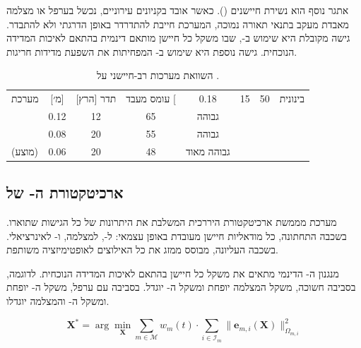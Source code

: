 אתגר נוסף הוא נשירת חיישנים (). כאשר 
אובד בקניונים עירוניים,  נכשל בערפל או מצלמה מאבדת
מעקב בתנאי תאורה נמוכה, המערכת חייבת להתדרדר באופן הדרגתי
ולא להתבדר. גישה מקובלת היא שימוש ב-,
שבו משקל כל חיישן מותאם דינמית בהתאם לאיכות המדידה הנוכחית.
גישה נוספת היא שימוש ב- המפחיתות
את השפעת מדידות חריגות.

\begin{table}[H]
\centering
\begin{tabular}{lcccc}
\toprule
מערכת &  [מ׳] & תדר [הרץ] & עומס מעבד [%
\midrule
{} & 0.18 & 15 & 50 & בינונית \\
 & 0.12 & 12 & 65 & גבוהה \\
 & 0.08 & 20 & 55 & גבוהה \\
 (מוצע) & 0.06 & 20 & 48 & גבוהה מאוד \\
\bottomrule
\end{tabular}
\caption{השוואת מערכות  רב-חיישני על .}
\label{tab:multi_sensor_fusion_comparison}
\end{table}

\subsection{ארכיטקטורת ה- של }
\label{subsec:navcrew_fusion}

מערכת  מממשת ארכיטקטורת  היררכית
המשלבת את היתרונות של כל הגישות שתוארו. בשכבה התחתונה, כל
מודאליות חיישן מעובדת באופן עצמאי:  ל-,
 למצלמה, ו- לאינרציאלי.
בשכבה העליונה,  מבוסס  ממזג את
כל האילוצים לאופטימיזציה משותפת.

מנגנון ה- הדינמי מתאים את משקל כל חיישן
בהתאם לאיכות המדידה הנוכחית. לדוגמה, בסביבה חשוכה, משקל
המצלמה יופחת ומשקל ה- יוגדל. בסביבה עם ערפל,
משקל ה- יופחת ומשקל ה- והמצלמה יוגדלו.

\begin{equation}
    \mathbf{X}^* = \arg\min_{\mathbf{X}} \sum_{m \in \mathcal{M}} w_m(t) \cdot \sum_{i \in \mathcal{I}_m} \| \mathbf{e}_{m,i}(\mathbf{X}) \|_{\Omega_{m,i}}^2
    \label{eq:navcrew_weighted_fusion}
\end{equation}

